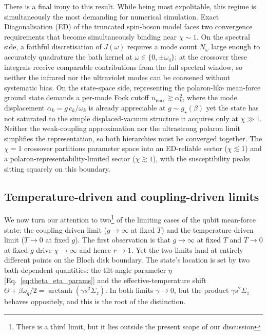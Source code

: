 There is a final irony to this result.  While being most expolitable, this regime is simultaneously the most demanding for
numerical simulation.  Exact Diagonalisation (ED) of the truncated spin-boson
model faces two convergence requirements that become simultaneously binding
near $\chi\sim 1$.  On the spectral side, a faithful discretisation of $J(\omega)$
requires a mode count $N_\omega$ large enough to accurately quadrature the bath
kernel at $\omega\in\{0,\pm\omega_q\}$: at the crossover these integrals receive
comparable contributions from the full spectral window, so neither the infrared
nor the ultraviolet modes can be coarsened without systematic bias.  On the
state-space side, representing the polaron-like mean-force ground state demands
a per-mode Fock cutoff $n_{\max}\gtrsim\alpha_k^2$, where the mode displacement
$\alpha_k = g\,c_k/\omega_k$ is already appreciable at $g\sim g_\star(\beta)$
yet the state has not saturated to the simple displaced-vacuum structure it
acquires only at $\chi\gg 1$.  Neither the weak-coupling approximation nor the
ultrastrong polaron limit simplifies the representation, so both hierarchies
must be converged together.  The $\chi=1$ crossover partitions parameter
space into an ED-reliable sector ($\chi\lesssim 1$) and a
polaron-representability-limited sector ($\chi\gtrsim 1$), with the
susceptibility peaks sitting squarely on this boundary. 

 
\subsection{Temperature-driven and coupling-driven limits}
\label{subsec:limits}
We now turn our attention to two\footnote{There is a third limit, but it lies outside the present scope of our discussion} of the limiting cases of the qubit mean-force state: the coupling-driven limit ($g\to\infty$ at fixed $T$) and the temperature-driven limit ($T\to 0$ at fixed $g$). The first observation is that $g\to\infty$ at fixed $T$ and $T\to 0$ at fixed $g$ drive $\chi\to\infty$
and hence $r\to 1$.  Yet the two limits land at entirely different points on the
Bloch disk boundary.  The state's location is set by two bath-dependent
quantities: the tilt-angle parameter $\eta$ [Eq.~\eqref{eq:theta_eta_params}]
and the effective-temperature shift $\Theta+\beta\omega_q/2 =
\operatorname{arctanh}(\gamma s^2\Sigma_z)$.  In both limits $\gamma\to 0$, but
the product $\gamma s^2\Sigma_z$ behaves oppositely, and this is the root of
the distinction.

